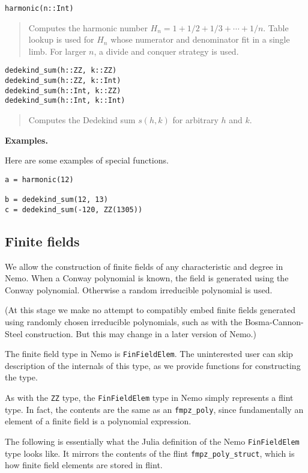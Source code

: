 \documentclass[a4paper,10pt]{article}
\newcommand{\code}{\lstinline}
\newcommand{\desc}[1]{\vspace{-3mm}\begin{quote}#1\end{quote}}
\begin{document}
{{{\begin{lstlisting}
harmonic(n::Int)
\end{lstlisting}

\desc{Computes the harmonic number $H_n = 1 + 1/2 + 1/3 + \cdots + 1/n$.
Table lookup is used for $H_n$ whose numerator and denominator 
fit in a single limb. For larger $n$, a divide and conquer strategy is used.}

\begin{lstlisting}
dedekind_sum(h::ZZ, k::ZZ)
dedekind_sum(h::ZZ, k::Int)
dedekind_sum(h::Int, k::ZZ)
dedekind_sum(h::Int, k::Int)
\end{lstlisting}

\desc{Computes the Dedekind sum $s(h,k)$ for arbitrary $h$ and $k$.}

\textbf{Examples.}

Here are some examples of special functions.

\begin{lstlisting}
a = harmonic(12)

b = dedekind_sum(12, 13)
c = dedekind_sum(-120, ZZ(1305))
\end{lstlisting}

\subsection{Finite fields}

We allow the construction of finite fields of any characteristic and degree in
Nemo. When a Conway polynomial is known, the field is generated using the 
Conway polynomial. Otherwise a random irreducible polynomial is used. 

(At this stage we make no attempt to compatibly embed finite fields generated 
using randomly chosen irreducible polynomials, such as with the 
Bosma-Cannon-Steel construction. But this may change in a later version of 
Nemo.) 

The finite field type in Nemo is \code{FinFieldElem}. The uninterested user can skip
description of the internals of this type, as we provide functions for 
constructing the type.

As with the \code{ZZ} type, the \code{FinFieldElem} type in Nemo simply represents a
flint type. In fact, the contents are the same as an \code{fmpz_poly}, since
fundamentally an element of a finite field is a polynomial expression.

The following is essentially what the Julia definition of the Nemo
\code{FinFieldElem} type looks like. It mirrors the contents of the
flint \code{fmpz_poly_struct}, which is how finite field elements are stored
in flint.

}}}
\end{document}
